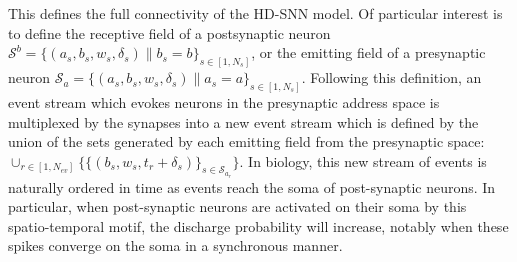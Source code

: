 \documentclass[runningheads]{llncs}
\newcommand{\presynaddr}{a} %
\newcommand{\postsynaddr}{b} %
\newcommand{\numevent}{N_{ev}} %
\newcommand{\arank}{r} %
\newcommand{\synapse}{\mathcal{S}} %
\newcommand{\synapticweight}{w} %
\newcommand{\synapticdelay}{\delta} %
\newcommand{\ranksyn}{s} %
\newcommand{\Nsyn}{N_{s}} %
\newcommand{\timev}{t} %
\begin{document}
This defines the full connectivity of the HD-SNN model. Of particular interest is to define the receptive field of a postsynaptic neuron $\synapse^\postsynaddr =  \{(\presynaddr_\ranksyn, \postsynaddr_\ranksyn, \synapticweight_\ranksyn, \synapticdelay_\ranksyn) \| \postsynaddr_\ranksyn=\postsynaddr\}_{\ranksyn \in [1,\Nsyn]} $, or the emitting field of a presynaptic neuron $\synapse_\presynaddr =  \{(\presynaddr_\ranksyn, \postsynaddr_\ranksyn, \synapticweight_\ranksyn, \synapticdelay_\ranksyn) \| \presynaddr_\ranksyn=\presynaddr\}_{\ranksyn \in [1,\Nsyn]}$. Following this definition, an event stream which evokes neurons in the presynaptic address space is multiplexed by the synapses into a new event stream which is defined by the union of the sets generated by each emitting field from the presynaptic space: 
$ \cup_{\arank \in [1,\numevent]} \{ \{(\postsynaddr_\ranksyn, \synapticweight_\ranksyn, \timev_\arank + \synapticdelay_\ranksyn) \}_{ \ranksyn \in \synapse_{\presynaddr_\arank}} \}$. In biology, this new stream of events is naturally ordered in time as events reach the soma of post-synaptic neurons. In particular, when post-synaptic neurons are activated on their soma by this spatio-temporal motif, the discharge probability will increase, notably when these spikes converge on the soma in a synchronous manner. 
\end{document}
